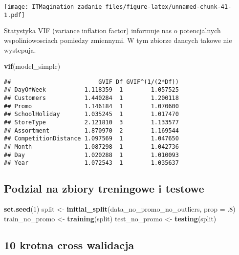 \documentclass[]{article}
\newenvironment{Shaded}{\begin{snugshade}}{\end{snugshade}}
\newcommand{\DataTypeTok}[1]{\textcolor[rgb]{0.13,0.29,0.53}{#1}}
\newcommand{\DecValTok}[1]{\textcolor[rgb]{0.00,0.00,0.81}{#1}}
\newcommand{\FloatTok}[1]{\textcolor[rgb]{0.00,0.00,0.81}{#1}}
\newcommand{\KeywordTok}[1]{\textcolor[rgb]{0.13,0.29,0.53}{\textbf{#1}}}
\newcommand{\NormalTok}[1]{#1}
\newcommand{\StringTok}[1]{\textcolor[rgb]{0.31,0.60,0.02}{#1}}
\begin{document}
\texttt{[image: ITMagination\_zadanie\_files/figure-latex/unnamed-chunk-41-1.pdf]}

Statystyka VIF (variance inflation factor) informuje nas o potencjalnych
wspoliniowosciach pomiedzy zmiennymi. W tym zbiorze dancych takowe nie
wystepuja.

\begin{Shaded}
\begin{Highlighting}[]
\KeywordTok{vif}\NormalTok{(model_simple)}
\end{Highlighting}
\end{Shaded}

\begin{verbatim}
##                         GVIF Df GVIF^(1/(2*Df))
## DayOfWeek           1.118359  1        1.057525
## Customers           1.440284  1        1.200118
## Promo               1.146184  1        1.070600
## SchoolHoliday       1.035245  1        1.017470
## StoreType           2.121810  3        1.133577
## Assortment          1.870970  2        1.169544
## CompetitionDistance 1.097569  1        1.047650
## Month               1.087298  1        1.042736
## Day                 1.020288  1        1.010093
## Year                1.072543  1        1.035637
\end{verbatim}

\hypertarget{podzial-na-zbiory-treningowe-i-testowe}{%
\subsection{Podzial na zbiory treningowe i
testowe}\label{podzial-na-zbiory-treningowe-i-testowe}}

\begin{Shaded}
\begin{Highlighting}[]
\KeywordTok{set.seed}\NormalTok{(}\DecValTok{1}\NormalTok{)}
\NormalTok{split <-}\StringTok{ }\KeywordTok{initial_split}\NormalTok{(data_no_promo_no_outliers, }\DataTypeTok{prop =} \FloatTok{.8}\NormalTok{)}
\NormalTok{train_no_promo <-}\StringTok{ }\KeywordTok{training}\NormalTok{(split)}
\NormalTok{test_no_promo <-}\StringTok{ }\KeywordTok{testing}\NormalTok{(split)}
\end{Highlighting}
\end{Shaded}

\hypertarget{krotna-cross-walidacja}{%
\subsection{10 krotna cross walidacja}\label{krotna-cross-walidacja}}
\end{document}

